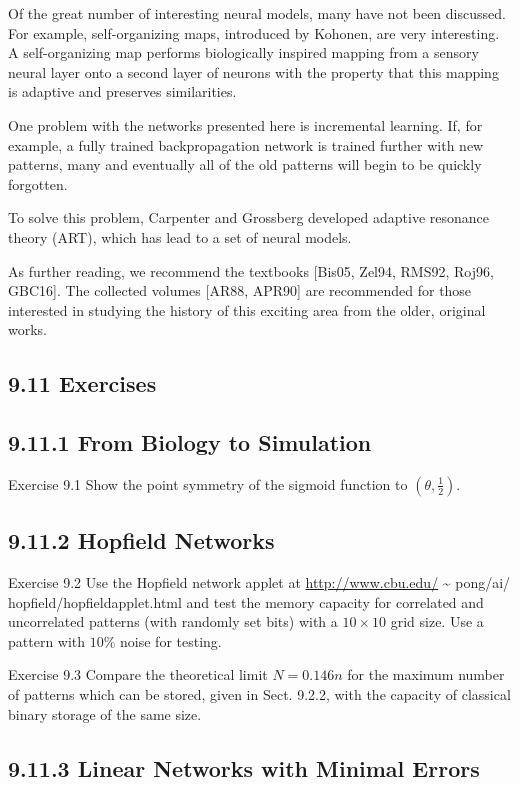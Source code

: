 \documentclass[10pt]{article}
\begin{document}
Of the great number of interesting neural models, many have not been discussed. For example, self-organizing maps, introduced by Kohonen, are very interesting. A self-organizing map performs biologically inspired mapping from a sensory neural layer onto a second layer of neurons with the property that this mapping is adaptive and preserves similarities.

One problem with the networks presented here is incremental learning. If, for example, a fully trained backpropagation network is trained further with new patterns, many and eventually all of the old patterns will begin to be quickly forgotten.

To solve this problem, Carpenter and Grossberg developed adaptive resonance theory (ART), which has lead to a set of neural models.


As further reading, we recommend the textbooks [Bis05, Zel94, RMS92, Roj96, GBC16]. The collected volumes [AR88, APR90] are recommended for those interested in studying the history of this exciting area from the older, original works.

\subsection*{9.11 Exercises}
\subsection*{9.11.1 From Biology to Simulation}
Exercise 9.1 Show the point symmetry of the sigmoid function to $\left(\theta, \frac{1}{2}\right)$.

\subsection*{9.11.2 Hopfield Networks}
Exercise 9.2 Use the Hopfield network applet at \href{http://www.cbu.edu/}{http://www.cbu.edu/} \~{} pong/ai/ hopfield/hopfieldapplet.html and test the memory capacity for correlated and uncorrelated patterns (with randomly set bits) with a $10 \times 10$ grid size. Use a pattern with $10 \%$ noise for testing.

Exercise 9.3 Compare the theoretical limit $N=0.146 n$ for the maximum number of patterns which can be stored, given in Sect. 9.2.2, with the capacity of classical binary storage of the same size.

\subsection*{9.11.3 Linear Networks with Minimal Errors}
\end{document}

